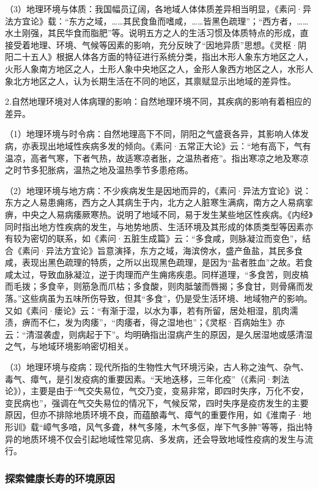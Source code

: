 \documentclass[draft,12pt]{ctexbook}
\begin{document}
（3）地理环境与体质：我国幅员辽阔，各地域人体体质差异相当明显，《素问·异法方宜论》载：“东方之域，……其民食鱼而嗜咸，……皆黑色疏理”；“西方者，……水土刚强，其民华食而脂肥”等。说明五方之人的生活习惯及体质特点的形成，直接受着地理、环境、气候等因素的影响，充分反映了“因地异质”思想。《灵枢·阴阳二十五人》根据人体各方面的特征进行系统分类，指出木形人象东方地区之人，火形人象南方地区之人，土形人象中央地区之人，金形人象西方地区之人，水形人象北方地区之人，认为长期生活在不同的地区，其禀赋显示出地域的差异性。

2.自然地理环境对人体病理的影响：自然地理环境不同，其疾病的影响有着相应的差异。

（1）地理环境与时令病：自然地理高下不同，阴阳之气盛衰各异，其影响人体发病，亦表现出地域性疾病多发的倾向。《素问·五常正大论》云：“地有高下，气有温凉，高者气寒，下者气热，故适寒凉者胀，之温热者疮”。指出寒凉之地及寒凉之时节多犯胀病，温热之地及温热季节多患疮疡。

（2）地理环境与地方病：不少疾病发生是因地而异的，《素问·异法方宜论》说：东方之人易患痈疡，西方之人其病生于内，北方之人脏寒生满病，南方之人易病挛痹，中央之人易病痿厥寒热。说明了地域不同，易于发生某些地区性疾病。《内经》同时指出地方性疾病的发生，与地势地质、生活环境及其形成的体质类型等因素亦有较为密切的联系，如《素问·五脏生成篇》云：“多食咸，则脉凝泣而变色”，结合《素问·异法方宜论》旨意演择，东方之域，海滨傍水，盛产鱼盐，其民多食咸，表现出黑色疏理的特质，之所以出现黑色疏理，是因为“盐者胜血”之故。若食咸太过，导致血脉凝泣，逆于肉理而产生痈疡疾患。同样道理，“多食苦，则皮槁而毛拨；多食辛，则筋急而爪枯；多食酸，则肉胝皱而唇揭；多食甘，则骨痛而发落。”这些病虽为五味所伤导致，但其“多食”，仍是受生活环境、地域物产的影响。又如《素问·瘘论》云：“有渐于湿，以水为事，若有所留，居处相湿，肌肉濡渍，痹而不仁，发为肉痿”，“肉痿者，得之湿地也”；《灵枢·百病始生》亦云：“清湿袭虚，则病起于下”。均明确指出湿病产生的原因，是久居湿地或感清湿之气，与地域环境影响密切相关。

（3）地理环境与疫病：现代所指的生物性大气环境污染，古人称之浊气、杂气、毒气、瘴气，是引发疫病的重要因素。“天地迭移，三年化疫”（《素问·刺法论》），主要是由于“气交失易位，气交乃变，变易非常，即四时失序，万化不安，变民病也”，强调在气交失易位的情况下，气候反常，四时失序是疫疠发生的主要原因，但亦不排除地质环境不良，而蕴酿毒气、瘴气的重要作用，如《淮南子·地形训》载“嶂气多喑，风气多聋，林气多隆，木气多伛，岸下气多肿”等等，指出特异的地质环境不仅会引起地域性常见病、多发病，还会导致地域性疫病的发生与流行。

\subsubsection{探索健康长寿的环境原因}%
\end{document}
